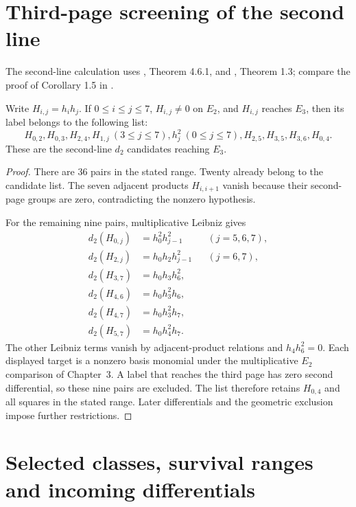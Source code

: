 \section{Third-page screening of the second line}


\begin{theorem}
\label{sem:AdamsCalculations:two-line-d2-screening}
The second-line calculation uses \cite{Adams60}, Theorem 4.6.1,
and \cite{LinExt4}, Theorem 1.3; compare the proof of Corollary 1.5
in \cite{LWX126}.

Write $H_{i,j}=h_ih_j$. If $0\leq i\leq j\leq7$,
$H_{i,j}\ne0$ on $E_2$, and $H_{i,j}$ reaches $E_3$, then its label
belongs to the following list:
\[
 H_{0,2},H_{0,3},H_{2,4},H_{1,j}\ (3\leq j\leq7),h_j^2\ (0\leq j\leq7),
 H_{2,5},H_{3,5},H_{3,6},H_{0,4}.
\]
These are the second-line $d_2$ candidates reaching $E_3$.
\end{theorem}
\begin{proof}
There are 36 pairs in the stated range. Twenty already belong
to the candidate list. The seven adjacent products $H_{i,i+1}$ vanish
because their second-page groups are zero, contradicting the
nonzero hypothesis.

For the remaining nine pairs, multiplicative Leibniz gives
\[
\begin{aligned}
d_2(H_{0,j})&=h_0^2h_{j-1}^2 &&(j=5,6,7),\\
d_2(H_{2,j})&=h_0h_2h_{j-1}^2 &&(j=6,7),\\
d_2(H_{3,7})&=h_0h_3h_6^2,\\
d_2(H_{4,6})&=h_0h_3^2h_6,\\
d_2(H_{4,7})&=h_0h_3^2h_7,\\
d_2(H_{5,7})&=h_0h_4^2h_7.
\end{aligned}
\]
The other Leibniz terms vanish by adjacent-product relations and
$h_4h_6^2=0$. Each displayed target is a nonzero basis
monomial under the multiplicative $E_2$ comparison of Chapter~3.
A label that reaches the third page has zero second differential,
so these nine pairs are excluded. The list therefore retains $H_{0,4}$
and all squares in the stated range. Later differentials and the
geometric exclusion impose further restrictions.
\end{proof}


\section{Selected classes, survival ranges and incoming differentials}

